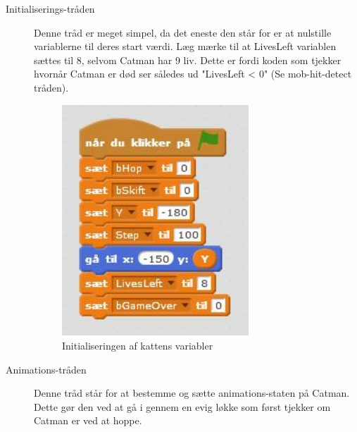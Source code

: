 \documentclass[12pt, a4paper, hidelinks]{article}
\begin{document}
\begin{description}
\item[Initialiserings-tråden] Denne tråd er meget simpel, da det eneste den står for er at nulstille variablerne til deres start værdi. Læg mærke til at LivesLeft variablen sættes til 8, selvom Catman har 9 liv. Dette er fordi koden som tjekker hvornår Catman er død ser således ud "LivesLeft < 0" (Se mob-hit-detect tråden).

\begin{figure}
  \begin{center}
    \includegraphics[width=70mm]{TKatInit.jpg}
  \end{center}
  \caption{Initialiseringen af kattens variabler}
  \label{fig:sample}
\end{figure}
 \FloatBarrier

\item[Animations-tråden] Denne tråd står for at bestemme og sætte animations-staten på Catman. Dette gør den ved at gå i gennem en evig løkke som først tjekker om Catman er ved at hoppe. \\


\end{description}
\end{document}
